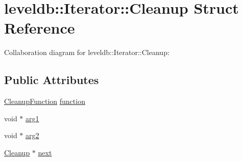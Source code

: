 \hypertarget{structleveldb_1_1_iterator_1_1_cleanup}{\section{leveldb\-:\-:Iterator\-:\-:Cleanup Struct Reference}
\label{structleveldb_1_1_iterator_1_1_cleanup}
}


Collaboration diagram for leveldb\-:\-:Iterator\-:\-:Cleanup\-:
\subsection*{Public Attributes}
\begin{DoxyCompactItemize}
\item 
\hyperlink{classleveldb_1_1_iterator_a3bb875a5d70208c14bcbd785c24e334f}{Cleanup\-Function} \hyperlink{structleveldb_1_1_iterator_1_1_cleanup_aa8a4f34ac312e21d83db4457bba40301}{function}
\item 
void $\ast$ \hyperlink{structleveldb_1_1_iterator_1_1_cleanup_a4f60a8f4786f1d8fbcf5b2039c8e39bc}{arg1}
\item 
void $\ast$ \hyperlink{structleveldb_1_1_iterator_1_1_cleanup_a957ccaa98c380048c59658542e419e89}{arg2}
\item 
\hyperlink{structleveldb_1_1_iterator_1_1_cleanup}{Cleanup} $\ast$ \hyperlink{structleveldb_1_1_iterator_1_1_cleanup_a9dea82023286b2ff15a1657bc22ed63c}{next}
\end{DoxyCompactItemize}



